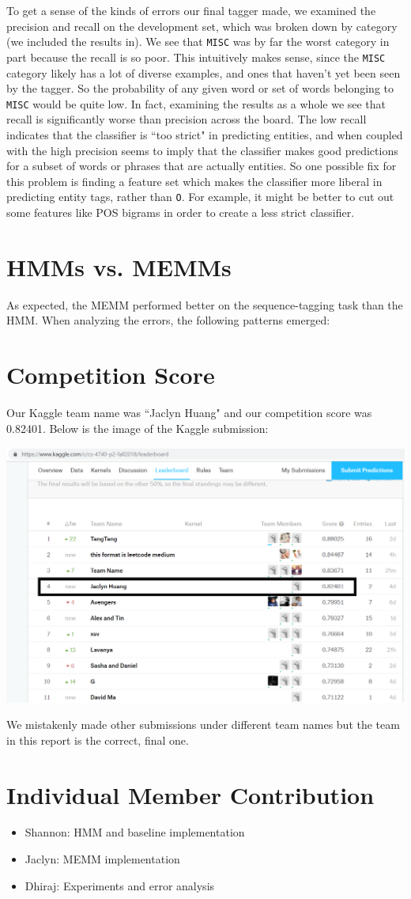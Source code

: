 \documentclass[12pt]{article}
\begin{document}
To get a sense of the kinds of errors our final tagger made, we examined the precision and recall on the development set, which was broken down by category (we included the results in). We see that {\tt MISC} was by far the worst category in part because the recall is so poor. This intuitively makes sense, since the {\tt MISC} category likely has a lot of diverse examples, and ones that haven't yet been seen by the tagger. So the probability of any given word or set of words belonging to {\tt MISC} would be quite low. In fact, examining the results as a whole we see that recall is significantly worse than precision across the board. The low recall indicates that the classifier is ``too strict" in predicting entities, and when coupled with the high precision seems to imply that the classifier makes good predictions for a subset of words or phrases that are actually entities. So one possible fix for this problem is finding a feature set which makes the classifier more liberal in predicting entity tags, rather than {\tt O}. For example, it might be better to cut out some features like POS bigrams in order to create a less strict classifier. 

\section{HMMs vs. MEMMs}
As expected, the MEMM performed better on the sequence-tagging task than the HMM. When analyzing the errors, the following patterns emerged:
\section{Competition Score}
Our Kaggle team name was ``Jaclyn Huang" and our competition score was 0.82401. Below is the image of the Kaggle submission:
\begin{center}
	\includegraphics[scale=0.25]{kaggle.png}
\end{center}
We mistakenly made other submissions under different team names but the team in this report is the correct, final one. 

\section{Individual Member Contribution}
\begin{itemize}
	\item Shannon: HMM and baseline implementation
	\item Jaclyn: MEMM implementation
	\item Dhiraj: Experiments and error analysis
\end{itemize}
\end{document}
